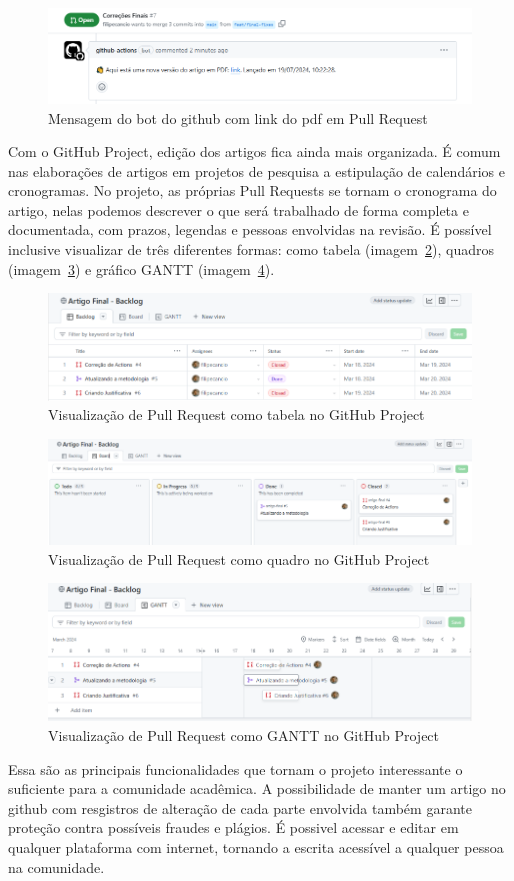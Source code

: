 \begin{figure}[ht]
	\centering
	\includegraphics[width=.6\textwidth]{./images/fig06.png}
	\caption{Mensagem do bot do github com link do pdf em Pull Request}
	\label{fig:fig06}
\end{figure}

Com o GitHub Project,  edição dos artigos fica ainda mais organizada. É comum nas elaborações de artigos em projetos de pesquisa a estipulação de calendários e cronogramas. No projeto, as próprias Pull Requests se tornam o cronograma do artigo, nelas podemos descrever o que será trabalhado de forma completa e documentada, com prazos, legendas e pessoas envolvidas na revisão. É possível inclusive visualizar de três diferentes formas: como tabela (imagem~\ref{fig:fig07}), quadros (imagem~\ref{fig:fig08}) e gráfico GANTT (imagem~\ref{fig:fig09}).

\begin{figure}[ht]
	\centering
	\includegraphics[width=.5\textwidth]{./images/fig07.png}
	\caption{Visualização de Pull Request como tabela no GitHub Project}
	\label{fig:fig07}
\end{figure}

\begin{figure}[ht]
	\centering
	\includegraphics[width=.5\textwidth]{./images/fig08.png}
	\caption{Visualização de Pull Request como quadro no GitHub Project}
	\label{fig:fig08}
\end{figure}

\begin{figure}[ht]
	\centering
	\includegraphics[width=.5\textwidth]{./images/fig09.png}
	\caption{Visualização de Pull Request como GANTT no GitHub Project}
	\label{fig:fig09}
\end{figure}

Essa são as principais funcionalidades que tornam o projeto interessante o suficiente para a comunidade acadêmica. A possibilidade de manter um artigo no github com resgistros de alteração de cada parte envolvida também garante proteção contra possíveis fraudes e plágios. É possivel acessar e editar em qualquer plataforma com internet, tornando a escrita acessível a qualquer pessoa na comunidade.
